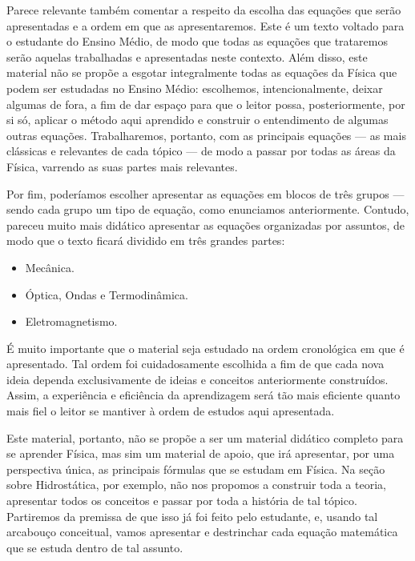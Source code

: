 Parece relevante também comentar a respeito da escolha das equações que serão apresentadas e a ordem em que as apresentaremos. Este é um texto voltado para o estudante do Ensino Médio, de modo que todas as equações que trataremos serão aquelas trabalhadas e apresentadas neste contexto. Além disso, este material não se propõe a esgotar integralmente todas as equações da Física que podem ser estudadas no Ensino Médio: escolhemos, intencionalmente, deixar algumas de fora, a fim de dar espaço para que o leitor possa, posteriormente, por si só, aplicar o método aqui aprendido e construir o entendimento de algumas outras equações. Trabalharemos, portanto, com as principais equações --- as mais clássicas e relevantes de cada tópico --- de modo a passar por todas as áreas da Física, varrendo as suas partes mais relevantes.

Por fim, poderíamos escolher apresentar as equações em blocos de três grupos --- sendo cada grupo um tipo de equação, como enunciamos anteriormente. Contudo, pareceu muito mais didático apresentar as equações organizadas por assuntos, de modo que o texto ficará dividido em três grandes partes:

\begin{itemize}
    \item [(i)] Mecânica.
    \item [(ii)] Óptica, Ondas e Termodinâmica.
    \item [(iii)] Eletromagnetismo.
\end{itemize}

É muito importante que o material seja estudado na ordem cronológica em que é apresentado. Tal ordem foi cuidadosamente escolhida a fim de que cada nova ideia dependa exclusivamente de ideias e conceitos anteriormente construídos. Assim, a experiência e eficiência da aprendizagem será tão mais eficiente quanto mais fiel o leitor se mantiver à ordem de estudos aqui apresentada.


Este material, portanto, não se propõe a ser um material didático completo para se aprender Física, mas sim um material de apoio, que irá apresentar, por uma perspectiva única, as principais fórmulas que se estudam em Física. Na seção sobre Hidrostática, por exemplo, não nos propomos a construir toda a teoria, apresentar todos os conceitos e passar por toda a história de tal tópico. Partiremos da premissa de que isso já foi feito pelo estudante, e, usando tal arcabouço conceitual, vamos apresentar e destrinchar cada equação matemática que se estuda dentro de tal assunto.

